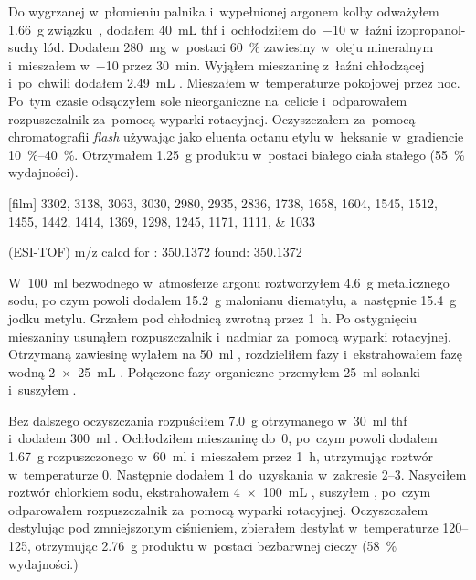 Do wygrzanej w~płomieniu palnika i~wypełnionej argonem kolby odważyłem \SI{1.66}{\gram}
  związku~, dodałem \SI{40}{\mL} \gls{thf}
  i~ochłodziłem do~\SI{-10}{\degC} w~łaźni izopropanol-suchy lód.
Dodałem \SI{280}{\mg}  w~postaci \SI{60}{\percent} zawiesiny w~oleju mineralnym
  i~mieszałem w~\SI{-10}{\degC} przez \SI{30}{\minute}.
Wyjąłem mieszaninę z~łaźni chłodzącej i~po~chwili dodałem \SI{2.49}{\mL} .
Mieszałem w~temperaturze pokojowej przez noc.
Po~tym czasie odsączyłem sole nieorganiczne na~celicie i~odparowałem rozpuszczalnik za~pomocą
  wyparki rotacyjnej.
Oczyszczałem za~pomocą chromatografii \textit{flash} używając jako eluenta octanu etylu w~heksanie
  w~gradiencie \SIrange{10}{40}{\percent}.
Otrzymałem \SI{1.25}{\gram} produktu w~postaci białego ciała stałego (\SI{55}{\percent} wydajności).
\begin{fullexp}
  [film] \numlist{3302; 3138; 3063; 3030; 2980; 2935; 2836; 1738; 1658; 1604; 1545; 1512; 1455; 1442; 1414; 1369; 1298; 1245; 1171; 1111; 1033}\par\noindent
   (ESI-TOF) m/z calcd for : \num{350.1372} found: \num{350.1372}
\end{fullexp}

W~\SI{100}{\ml} bezwodnego  w~atmosferze argonu roztworzyłem \SI{4.6}{\gram} metalicznego sodu,
  po czym powoli dodałem \SI{15.2}{\gram} malonianu diematylu, a~następnie \SI{15.4}{\gram} jodku metylu.
Grzałem pod chłodnicą zwrotną przez \SI{1}{\hour}.
Po ostygnięciu mieszaniny usunąłem rozpuszczalnik i~nadmiar  za~pomocą wyparki rotacyjnej.
Otrzymaną zawiesinę wylałem na \SI{50}{\ml} , rozdzieliłem fazy i~ekstrahowałem fazę wodną
  \SI[product-units = single]{2 x 25}{\mL} .
Połączone fazy organiczne przemyłem \SI{25}{\ml} solanki i~suszyłem .

Bez dalszego oczyszczania rozpuściłem \SI{7.0}{\gram} otrzymanego 
  w~\SI{30}{\ml} \gls{thf} i~dodałem \SI{300}{\ml} .
Ochłodziłem mieszaninę do~\SI{0}{\degC}, po~czym powoli dodałem \SI{1.67}{\gram} 
  rozpuszczonego w~\SI{60}{\ml}  i~mieszałem przez \SI{1}{\hour},
  utrzymując roztwór w~temperaturze \SI{0}{\degC}.
Następnie dodałem \SI{1}{\Molar}  do~uzyskania \pH w~zakresie \numrange{2}{3}.
Nasyciłem roztwór chlorkiem sodu, ekstrahowałem \SI[product-units = single]{4 x 100}{\mL} ,
  suszyłem , po~czym odparowałem rozpuszczalnik za~pomocą wyparki rotacyjnej.
Oczyszczałem destylując pod zmniejszonym ciśnieniem, zbierałem destylat w~temperaturze
  \SIrange{120}{125}{\degC}, otrzymując \SI{2.76}{\gram} produktu w~postaci bezbarwnej cieczy
  (\SI{58}{\percent} wydajności.)

